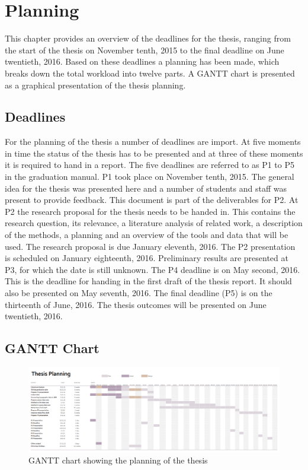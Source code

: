 

\chapter{Planning}
\label{chap:planning}

This chapter provides an overview of the deadlines for the thesis, ranging from the start of the thesis on November tenth, 2015 to the final deadline on June twentieth, 2016. Based on these deadlines a planning has been made, which breaks down the total workload into twelve parts. A GANTT chart is presented as a graphical presentation of the thesis planning. 

\section{Deadlines}
For the planning of the thesis a number of deadlines are import. At five moments in time the status of the thesis has to be presented and at three of these moments it is required to hand in a report. The five deadlines are referred to as P1 to P5 in the graduation manual. P1 took place on November tenth, 2015. The general idea for the thesis was presented here and a number of students and staff was present to provide feedback. This document is part of the deliverables for P2. At P2 the research proposal for the thesis needs to be handed in. This contains the research question, its relevance, a literature analysis of related work, a description of the methods, a planning and an overview of the tools and data that will be used. The research proposal is due January eleventh, 2016. The P2 presentation is scheduled on January eighteenth, 2016. Preliminary results are presented at P3, for which the date is still unknown. The P4 deadline is on May second, 2016. This is the deadline for handing in the first draft of the thesis report. It should also be presented on May seventh, 2016. The final deadline (P5) is on the thirteenth of June, 2016. The thesis outcomes will be presented on June twentieth, 2016.

\section{GANTT Chart}
\begin{figure}
	\centering
	\includegraphics[width=2\linewidth, angle=90]{figs/GANTT-chart.png}
	\caption{GANTT chart showing the planning of the thesis}
	\label{fig:GANTT}
\end{figure}